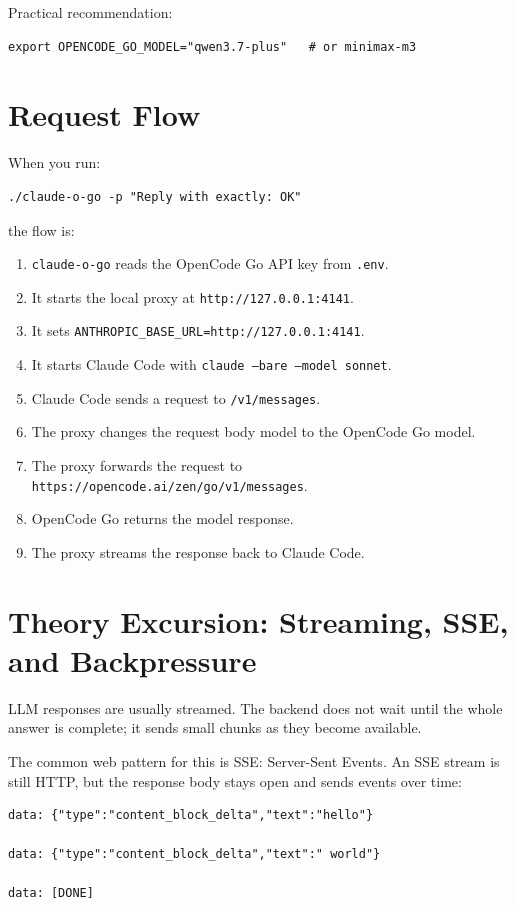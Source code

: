 \documentclass[11pt,a4paper]{article}
\newcommand{\code}[1]{\texttt{#1}}
\begin{document}
Practical recommendation:

\begin{verbatim}
export OPENCODE_GO_MODEL="qwen3.7-plus"   # or minimax-m3
\end{verbatim}

\section{Request Flow}

When you run:

\begin{verbatim}
./claude-o-go -p "Reply with exactly: OK"
\end{verbatim}

the flow is:

\begin{enumerate}
  \item \code{claude-o-go} reads the OpenCode Go API key from \code{.env}.
  \item It starts the local proxy at \code{http://127.0.0.1:4141}.
  \item It sets \code{ANTHROPIC\_BASE\_URL=http://127.0.0.1:4141}.
  \item It starts Claude Code with \code{claude --bare --model sonnet}.
  \item Claude Code sends a request to \code{/v1/messages}.
  \item The proxy changes the request body model to the OpenCode Go model.
  \item The proxy forwards the request to \code{https://opencode.ai/zen/go/v1/messages}.
  \item OpenCode Go returns the model response.
  \item The proxy streams the response back to Claude Code.
\end{enumerate}

\section{Theory Excursion: Streaming, SSE, and Backpressure}

LLM responses are usually streamed. The backend does not wait until the whole
answer is complete; it sends small chunks as they become available.

The common web pattern for this is SSE: Server-Sent Events. An SSE stream is
still HTTP, but the response body stays open and sends events over time:

\begin{verbatim}
data: {"type":"content_block_delta","text":"hello"}

data: {"type":"content_block_delta","text":" world"}

data: [DONE]
\end{verbatim}
\end{document}
